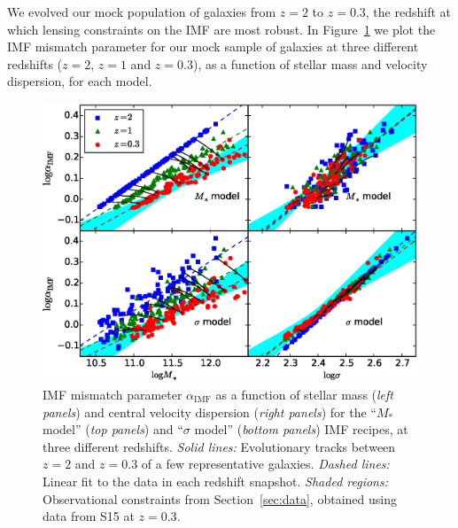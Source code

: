 \documentclass[usenatbib, letters]{mnras}
\def\aimf{\alpha_{\mathrm{IMF}}}
\def\Sref#1{Section~\ref{#1}\xspace}
\def\Fref#1{Figure~\ref{#1}\xspace}
\def\Eref#1{Equation~\ref{#1}\xspace}
\begin{document}
We evolved our mock population of galaxies from $z=2$ to $z=0.3$, the redshift at which lensing constraints on the IMF are most robust.
In \Fref{fig:snap} we plot the IMF mismatch parameter for our mock sample of galaxies at three different redshifts ($z=2$, $z=1$ and $z=0.3$), as a function of stellar mass and velocity dispersion, for each model.
%
\begin{figure}
 \includegraphics[width=\textwidth]{snapshots.eps}
 \caption{ IMF mismatch parameter $\aimf$ as a function of stellar mass ({\em left panels}) and central velocity dispersion ({\em right panels}) for the ``$M_*$ model'' ({\em top panels}) and ``$\sigma$ model'' ({\em bottom panels}) IMF recipes, at three different redshifts.
{\em Solid lines:} Evolutionary tracks between $z=2$ and $z=0.3$ of a few representative galaxies.
{\em Dashed lines:} Linear fit to the data in each redshift snapshot.
{\em Shaded regions:} Observational constraints from \Sref{sec:data}, obtained using data from S15 at $z=0.3$.
}
 \label{fig:snap}
\end{figure}
%
\end{document}
